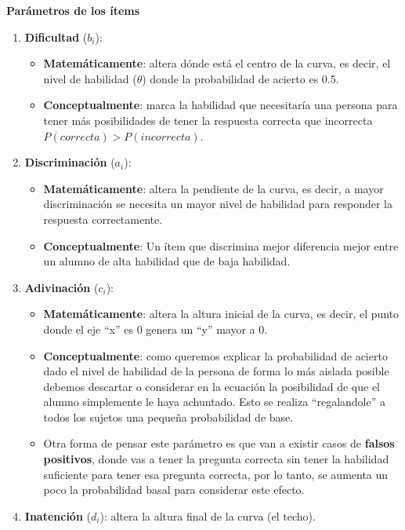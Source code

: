 \documentclass[
  letterpaper,
  DIV=11,
  numbers=noendperiod]{scrreprt}
\providecommand{\tightlist}{%
  \setlength{\itemsep}{0pt}\setlength{\parskip}{0pt}}
\begin{document}
\textbf{Parámetros de los ítems}

\begin{enumerate}
\def\labelenumi{\arabic{enumi}.}
\tightlist
\item
  \textbf{Dificultad} (\(b_i\)):

  \begin{itemize}
  \item
    \textbf{Matemáticamente}: altera dónde está el centro de la curva,
    es decir, el nivel de habilidad (\(\theta\)) donde la probabilidad
    de acierto es 0.5.
  \item
    \textbf{Conceptualmente}: marca la habilidad que necesitaría una
    persona para tener más posibilidades de tener la respuesta correcta
    que incorrecta \(P(correcta)>P(incorrecta)\).
  \end{itemize}
\item
  \textbf{Discriminación} (\(a_i\)):

  \begin{itemize}
  \item
    \textbf{Matemáticamente}: altera la pendiente de la curva, es decir,
    a mayor discriminación se necesita un mayor nivel de habilidad para
    responder la respuesta correctamente.
  \item
    \textbf{Conceptualmente}: Un ítem que discrimina mejor diferencia
    mejor entre un alumno de alta habilidad que de baja habilidad.
  \end{itemize}
\item
  \textbf{Adivinación} (\(c_i\)):

  \begin{itemize}
  \item
    \textbf{Matemáticamente}: altera la altura inicial de la curva, es
    decir, el punto donde el eje ``x'' es 0 genera un ``y'' mayor a 0.
  \item
    \textbf{Conceptualmente}: como queremos explicar la probabilidad de
    acierto dado el nivel de habilidad de la persona de forma lo más
    aislada posible debemos descartar o considerar en la ecuación la
    posibilidad de que el alumno simplemente le haya achuntado. Esto se
    realiza ``regalandole'' a todos los sujetos una pequeña probabilidad
    de base.
  \item
    Otra forma de pensar este parámetro es que van a existir casos de
    \textbf{falsos positivos}, donde vas a tener la pregunta correcta
    sin tener la habilidad suficiente para tener esa pregunta correcta,
    por lo tanto, se aumenta un poco la probabilidad basal para
    considerar este efecto.
  \end{itemize}
\item
  \textbf{Inatención} (\(d_i\)): altera la altura final de la curva (el
  techo).


\end{enumerate}
\end{document}
